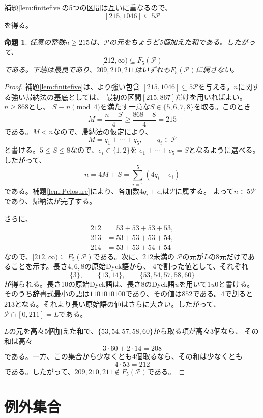 \documentclass[12pt]{ltjsarticle}
\theoremstyle{plain}
\newtheorem{proposition}[theorem]{命題}
\newcommand{\Pset}{\mathcal P}
\begin{document}
補題\ref{lem:finitefive}の5つの区間は互いに重なるので、
\[
 [215,1046]\subseteq5\Pset
\]
を得る。

\begin{proposition}\label{prop:fiveP}
任意の整数$n\geq215$は、$\Pset$の元をちょうど5個加えた和である。したがって、
\[
 [212,\infty)\subseteq F_5(\Pset)
\]
である。下端は最良であり、$209,210,211$はいずれも$F_5(\Pset)$に属さない。
\end{proposition}

\begin{proof}
補題\ref{lem:finitefive}は、より強い包含
$[215,1046]\subseteq5\Pset$を与える。$n$に関する強い帰納法の基底としては、
最初の区間$[215,867]$だけを用いればよい。$n\geq868$とし、
$S\equiv n\pmod4$を満たす一意な$S\in\{5,6,7,8\}$を取る。このとき
\[
 M=\frac{n-S}{4}\geq\frac{868-8}{4}=215
\]
である。$M<n$なので、帰納法の仮定により、
\[
 M=q_1+\cdots+q_5,\qquad q_i\in\Pset
\]
と書ける。$5\leq S\leq8$なので、$e_i\in\{1,2\}$を
$e_1+\cdots+e_5=S$となるように選べる。したがって、
\[
 n=4M+S=\sum_{i=1}^{5}(4q_i+e_i)
\]
である。補題\ref{lem:Pclosure}により、各加数$4q_i+e_i$は$\Pset$に属する。
よって$n\in5\Pset$であり、帰納法が完了する。

さらに、
\[
\begin{aligned}
212&=53+53+53+53,\\
213&=53+53+53+54,\\
214&=53+53+54+54
\end{aligned}
\]
なので、$[212,\infty)\subseteq F_5(\Pset)$である。次に、$212$未満の
$\Pset$の元が$L$の8元だけであることを示す。長さ$4,6,8$の原始Dyck語から、
$4$で割った値として、それぞれ
\[
 \{3\},\qquad \{13,14\},\qquad \{53,54,57,58,60\}
\]
が得られる。長さ10の原始Dyck語は、長さ8のDyck語$u$を用いて$1u0$と書ける。
そのうち辞書式最小の語は$1101010100$であり、その値は$852$である。$4$で割ると
$213$となる。それより長い原始語の値はさらに大きい。したがって、
$\Pset\cap[0,211]=L$である。

$L$の元を高々5個加えた和で、$\{53,54,57,58,60\}$から取る項が高々3個なら、
その和は高々
\[
 3\cdot60+2\cdot14=208
\]
である。一方、この集合から少なくとも4個取るなら、その和は少なくとも
\[
 4\cdot53=212
\]
である。したがって、$209,210,211\notin F_5(\Pset)$である。
\end{proof}

\section{例外集合}\label{sec:exceptions}
\end{document}
